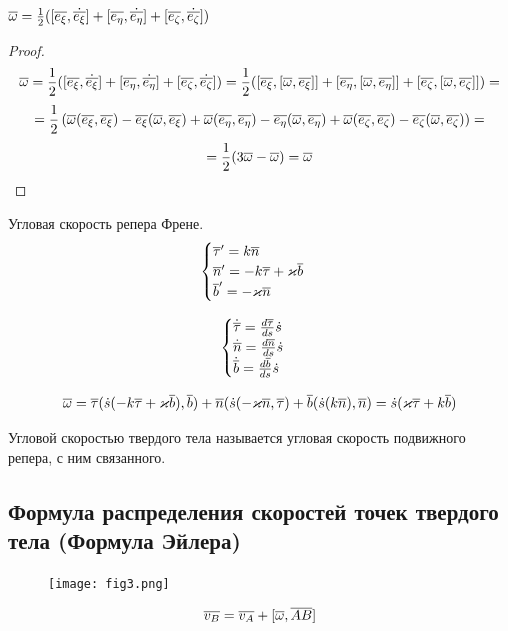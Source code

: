   \begin{ass}
  $ {\overline{\omega}} = \frac{1}{2} ([{\overline{e_{\xi}}}, \dot{{\overline{e_{\xi}}}}] + [{\overline{e_{\eta}}}, \dot{{\overline{e_{\eta}}}}] + [{\overline{e_{\zeta}}}, \dot{{\overline{e_{\zeta}}}}]) $
  \end{ass}
  \begin{proof}
  $$ {\overline{\omega}} 
  = \frac{1}{2} ([{\overline{e_{\xi}}}, \dot{{\overline{e_{\xi}}}}] + [{\overline{e_{\eta}}}, \dot{{\overline{e_{\eta}}}}] + [{\overline{e_{\zeta}}}, \dot{{\overline{e_{\zeta}}}}]) 
  = \frac{1}{2} ([{\overline{e_{\xi}}}, [{\overline{\omega}}, {\overline{e_{\xi}}}]] + [{\overline{e_{\eta}}}, [{\overline{\omega}}, {\overline{e_{\eta}}}]] + [{\overline{e_{\zeta}}}, [{\overline{\omega}}, {\overline{e_{\zeta}}}]]) = $$
  $$ = \frac{1}{2} \left( {\overline{\omega}}({\overline{e_{\xi}}}, {\overline{e_{\xi}}}) - {\overline{e_{\xi}}}({\overline{\omega}}, {\overline{e_{\xi}}}) + {\overline{\omega}}({\overline{e_{\eta}}}, {\overline{e_{\eta}}}) - {\overline{e_{\eta}}}({\overline{\omega}}, {\overline{e_{\eta}}}) + {\overline{\omega}}({\overline{e_{\zeta}}}, {\overline{e_{\zeta}}}) - {\overline{e_{\zeta}}}({\overline{\omega}}, {\overline{e_{\zeta}}}) \right) = $$ 
  $$ = \frac{1}{2}(3{\overline{\omega}} - {\overline{\omega}}) = {\overline{\omega}} $$
  \end{proof}
  
  \begin{xmp}
  Угловая скорость репера Френе.
  $$ 
  \begin{cases}
  {\overline{\tau}}' = k {\overline{n}} \\
  {\overline{n}}' = - k{\overline{\tau}} + \varkappa {\overline{b}} \\
  {\overline{b}}' = -\varkappa{\overline{n}}
  \end{cases}
  $$
  
  $$
  \begin{cases}
  \dot{{\overline{\tau}}} = \frac{d{\overline{\tau}}}{ds} \dot s \\
  \dot{{\overline{n}}} = \frac{d{\overline{n}}}{ds} \dot s \\
  \dot{{\overline{b}}} = \frac{d{\overline{b}}}{ds} \dot s \\
  \end{cases} 
  $$
  
  $$ {\overline{\omega}} = {\overline{\tau}}(\dot s (-k{\overline{\tau}} + \varkappa{\overline{b}}), {\overline{b}}) + {\overline{n}}(\dot s (-\varkappa{\overline{n}}, {\overline{\tau}}) + {\overline{b}}(\dot s(k {\overline{n}}), {\overline{n}}) = \dot s (\varkappa{\overline{\tau}} + k{\overline{b}}) $$
  \end{xmp}
  
  \begin{df}
  Угловой скоростью твердого тела называется угловая скорость подвижного репера, с ним связанного.
  \end{df}
 
  \subsection{Формула распределения скоростей точек твердого тела (Формула Эйлера)}
  \begin{figure}[H]
  \centering
  \texttt{[image: fig3.png]} 
  \end{figure}  
  $$ {\overline{v_B}} = {\overline{v_A}} + [{\overline{\omega}}, {\overline{AB}}] $$
  
